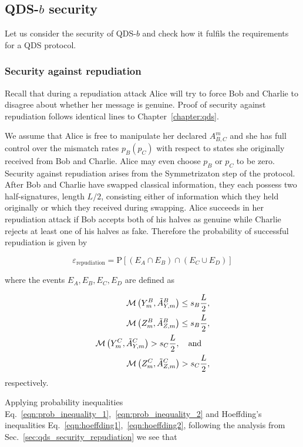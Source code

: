 \subsection{QDS-$b$ security}
Let us consider the security of QDS-$b$ and check how it fulfils the requirements for a QDS protocol. 

\subsubsection{Security against repudiation}
Recall that during a repudiation attack Alice will try to force Bob and Charlie to disagree about whether her message is genuine. Proof of security against repudiation follows identical lines to Chapter~\ref{chapter:qds}.

We assume that Alice is free to manipulate her declared $A_{B, C}^m$ and she has full control over the mismatch rates $p_B \left(p_C\right)$ with respect to states she originally received from Bob and Charlie. Alice may even choose $p_B$ or $p_C$ to be zero. Security against repudiation arises from the Symmetrizaton step of the protocol. After Bob and Charlie have swapped classical information, they each possess two half-signatures, length $L/2$, consisting either of information which they held originally or which they received during swapping. Alice succeeds in her repudiation attack if Bob accepts both of his halves as genuine while Charlie rejects at least one of his halves as fake. Therefore the probability of successful repudiation is given by

\begin{equation}
\varepsilon_{\text{repudiation}} = \text{P}\left[\left(E_A \cap E_B\right) \cap \left(E_C \cup E_D\right) \right]
\end{equation}

\noindent where the events $E_A, E_B, E_C, E_D$ are defined as

\begin{align}
\mathcal{M}\left(Y_m^B, \tilde{A}_{Y, m}^B\right) \le s_B \frac{L}{2}, \notag \\
%
\mathcal{M}\left(Z_m^B, \tilde{A}_{Z, m}^B\right) \le s_B \frac{L}{2}, \notag \\
%
\mathcal{M}\left(Y_m^C, \tilde{A}_{Y, m}^C\right) > s_C \frac{L}{2}, \qq{and}\notag \\
%
\mathcal{M}\left(Z_m^C, \tilde{A}_{Z, m}^C\right) > s_C \frac{L}{2},
\end{align}
respectively.

Applying probability inequalities Eq.~\ref{eqn:prob_inequality_1},~\ref{eqn:prob_inequality_2} and Hoeffding's inequalities Eq.~\ref{eqn:hoeffding1},~\ref{eqn:hoeffding2}, following the analysis from Sec.~\ref{sec:qds_security_repudiation} we see that

